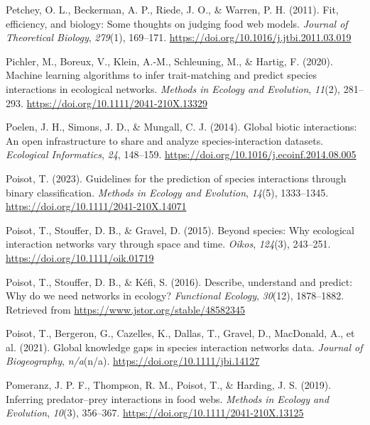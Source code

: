 \documentclass[
]{agujournal2019}
\newlength{\cslhangindent}
\newenvironment{CSLReferences}[2] %
 {\begin{list}{}{%
  \setlength{\itemindent}{0pt}
  \setlength{\leftmargin}{0pt}
  \setlength{\parsep}{0pt}
  \ifodd #1
   \setlength{\leftmargin}{\cslhangindent}
   \setlength{\itemindent}{-1\cslhangindent}
  \fi
  \setlength{\itemsep}{#2\baselineskip}}}
 {\end{list}}
\begin{document}
\begin{CSLReferences}{1}{0}
Petchey, O. L., Beckerman, A. P., Riede, J. O., \& Warren, P. H. (2011).
Fit, efficiency, and biology: {Some} thoughts on judging food web
models. \emph{Journal of Theoretical Biology}, \emph{279}(1), 169--171.
\url{https://doi.org/10.1016/j.jtbi.2011.03.019}

Pichler, M., Boreux, V., Klein, A.-M., Schleuning, M., \& Hartig, F.
(2020). Machine learning algorithms to infer trait-matching and predict
species interactions in ecological networks. \emph{Methods in Ecology
and Evolution}, \emph{11}(2), 281--293.
\url{https://doi.org/10.1111/2041-210X.13329}

Poelen, J. H., Simons, J. D., \& Mungall, C. J. (2014). Global biotic
interactions: {An} open infrastructure to share and analyze
species-interaction datasets. \emph{Ecological Informatics}, \emph{24},
148--159. \url{https://doi.org/10.1016/j.ecoinf.2014.08.005}

Poisot, T. (2023). Guidelines for the prediction of species interactions
through binary classification. \emph{Methods in Ecology and Evolution},
\emph{14}(5), 1333--1345. \url{https://doi.org/10.1111/2041-210X.14071}

Poisot, T., Stouffer, D. B., \& Gravel, D. (2015). Beyond species: Why
ecological interaction networks vary through space and time.
\emph{Oikos}, \emph{124}(3), 243--251.
\url{https://doi.org/10.1111/oik.01719}

Poisot, T., Stouffer, D. B., \& Kéfi, S. (2016). Describe, understand
and predict: Why do we need networks in ecology? \emph{Functional
Ecology}, \emph{30}(12), 1878--1882. Retrieved from
\url{https://www.jstor.org/stable/48582345}

Poisot, T., Bergeron, G., Cazelles, K., Dallas, T., Gravel, D.,
MacDonald, A., et al. (2021). Global knowledge gaps in species
interaction networks data. \emph{Journal of Biogeography},
\emph{n/a}(n/a). \url{https://doi.org/10.1111/jbi.14127}

Pomeranz, J. P. F., Thompson, R. M., Poisot, T., \& Harding, J. S.
(2019). Inferring predator--prey interactions in food webs.
\emph{Methods in Ecology and Evolution}, \emph{10}(3), 356--367.
\url{https://doi.org/10.1111/2041-210X.13125}


\end{CSLReferences}
\end{document}
